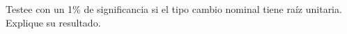 \documentclass[10pt,a4paper]{article}
\begin{document}
\begin{enumerate}
  Testee con un 1\% de significancia si el tipo cambio nominal tiene raíz unitaria. Explique su resultado.  


  















\end{enumerate}
\end{document}
